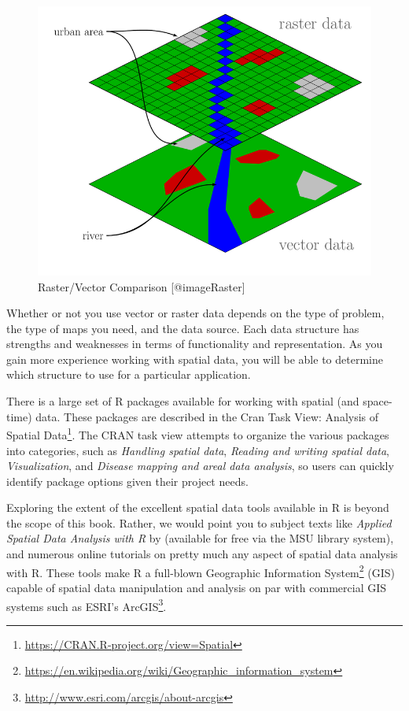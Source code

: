\documentclass[
]{krantz}
\renewcommand{\href}[2]{#2\footnote{\url{#1}}}
\begin{document}
\begin{figure}

{\centering \includegraphics[width=1\linewidth]{../figures/Raster_vector_tikz} 

}

\caption{Raster/Vector Comparison [@imageRaster]}\label{fig:raster}
\end{figure}

Whether or not you use vector or raster data depends on the type of problem, the type of maps you need, and the data source. Each data structure has strengths and weaknesses in terms of functionality and representation. As you gain more experience working with spatial data, you will be able to determine which structure to use for a particular application.

There is a large set of R packages available for working with spatial (and space-time) data. These packages are described in the \href{https://CRAN.R-project.org/view=Spatial}{Cran Task View: Analysis of Spatial Data}. The CRAN task view attempts to organize the various packages into categories, such as \emph{Handling spatial data}, \emph{Reading and writing spatial data}, \emph{Visualization}, and \emph{Disease mapping and areal data analysis}, so users can quickly identify package options given their project needs.

Exploring the extent of the excellent spatial data tools available in R is beyond the scope of this book. Rather, we would point you to subject texts like \emph{Applied Spatial Data Analysis with R} by \citet{Bivand13} (available for free via the MSU library system), and numerous online tutorials on pretty much any aspect of spatial data analysis with R. These tools make R a full-blown \href{https://en.wikipedia.org/wiki/Geographic_information_system}{Geographic Information System} (GIS) capable of spatial data manipulation and analysis on par with commercial GIS systems such as \href{http://www.esri.com/arcgis/about-arcgis}{ESRI's ArcGIS}.
\end{document}
